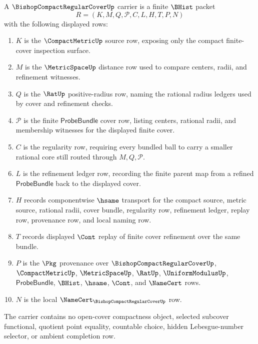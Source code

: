 \begin{definition}
\label{def:compact-regular-cover-carrier}
A $\BishopCompactRegularCoverUp$ carrier is a finite $\BHist$ packet
$$
R=(K,M,Q,\mathcal{P},C,L,H,T,P,N)
$$
with the following displayed rows:
\begin{enumerate}
\item $K$ is the $\CompactMetricUp$ source row, exposing only the compact finite-cover inspection surface.
\item $M$ is the $\MetricSpaceUp$ distance row used to compare centers, radii, and refinement witnesses.
\item $Q$ is the $\RatUp$ positive-radius row, naming the rational radius ledgers used by cover and refinement checks.
\item $\mathcal{P}$ is the finite $\mathsf{ProbeBundle}$ cover row, listing centers, rational radii, and membership witnesses for the displayed finite cover.
\item $C$ is the regularity row, requiring every bundled ball to carry a smaller rational core still routed through $M,Q,\mathcal{P}$.
\item $L$ is the refinement ledger row, recording the finite parent map from a refined $\mathsf{ProbeBundle}$ back to the displayed cover.
\item $H$ records componentwise $\hsame$ transport for the compact source, metric source, rational radii, cover bundle, regularity row, refinement ledger, replay row, provenance row, and local naming row.
\item $T$ records displayed $\Cont$ replay of finite cover refinement over the same bundle.
\item $P$ is the $\Pkg$ provenance over $\BishopCompactRegularCoverUp$, $\CompactMetricUp$, $\MetricSpaceUp$, $\RatUp$, $\UniformModulusUp$, $\mathsf{ProbeBundle}$, $\BHist$, $\hsame$, $\Cont$, and $\NameCert$ rows.
\item $N$ is the local $\NameCert_{\BishopCompactRegularCoverUp}$ row.
\end{enumerate}
The carrier contains no open-cover compactness object, selected subcover functional, quotient point equality, countable choice, hidden Lebesgue-number selector, or ambient completion row.
\end{definition}

